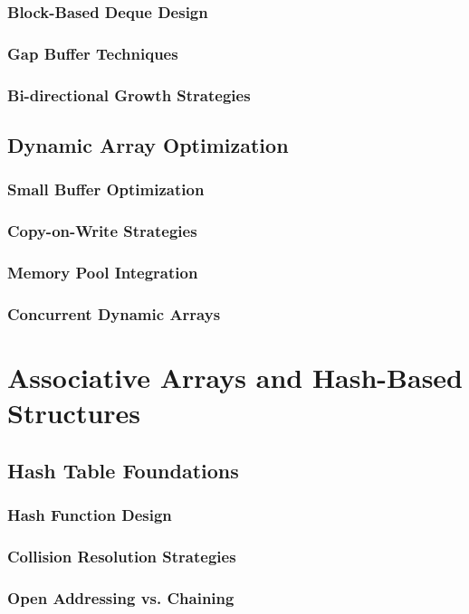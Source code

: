 \documentclass[12pt, oneside]{book}
\begin{document}
\subsubsection{Block-Based Deque Design}
\subsubsection{Gap Buffer Techniques}
\subsubsection{Bi-directional Growth Strategies}

\subsection{Dynamic Array Optimization}
\subsubsection{Small Buffer Optimization}
\subsubsection{Copy-on-Write Strategies}
\subsubsection{Memory Pool Integration}
\subsubsection{Concurrent Dynamic Arrays}

\section{Associative Arrays and Hash-Based Structures}
\subsection{Hash Table Foundations}
\subsubsection{Hash Function Design}
\subsubsection{Collision Resolution Strategies}
\subsubsection{Open Addressing vs. Chaining}
\end{document}
